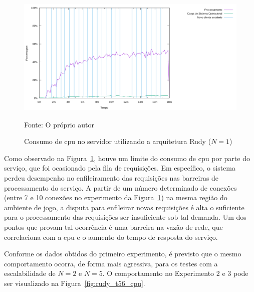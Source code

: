 \begin{figure}[htb!]
    \caption{Consumo de \ac{cpu} no servidor utilizando a arquitetura Rudy ($N=1$)}
    \label{fig:rudy_t4_cpu}
    \includegraphics[width=\textwidth]{metricas_rudy_t4/cpu.png}
    \centering
    
    Fonte: O próprio autor
\end{figure}


Como observado na Figura~\ref{fig:rudy_t4_cpu}, houve um limite do consumo de \ac{cpu} por parte do serviço, que foi ocasionado pela fila de requisições.
%
Em específico, o sistema perdeu desempenho no enfileiramento das requisições nas barreiras de processamento do serviço.
%
A partir de um número determinado de conexões (entre 7 e 10 conexões no experimento da Figura~\ref{fig:rudy_t4_cpu}) na mesma região do ambiente de jogo, a disputa para enfileirar novas requisições é alta o suficiente para o processamento das requisições ser insuficiente sob tal demanda.
%
Um dos pontos que provam tal ocorrência é uma barreira na vazão de rede, que correlaciona com a \ac{cpu} e o aumento do tempo de resposta do serviço.

Conforme os dados obtidos do primeiro experimento, é previsto que o mesmo comportamento ocorra, de forma mais agressiva, para os testes com a escalabilidade de $N=2$ e $N=5$.
%
O comportamento no Experimento 2 e 3 pode ser visualizado na Figura~\ref{fig:rudy_t56_cpu}.

